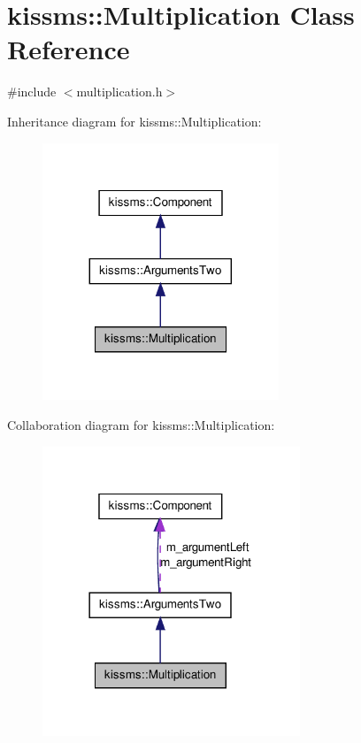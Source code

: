 \hypertarget{classkissms_1_1_multiplication}{\section{kissms\-:\-:Multiplication Class Reference}
\label{classkissms_1_1_multiplication}
}


{\ttfamily \#include $<$multiplication.\-h$>$}



Inheritance diagram for kissms\-:\-:Multiplication\-:
\nopagebreak
\begin{figure}[H]
\begin{center}
\leavevmode
\includegraphics[width=200pt]{classkissms_1_1_multiplication__inherit__graph}
\end{center}
\end{figure}


Collaboration diagram for kissms\-:\-:Multiplication\-:
\nopagebreak
\begin{figure}[H]
\begin{center}
\leavevmode
\includegraphics[width=218pt]{classkissms_1_1_multiplication__coll__graph}
\end{center}
\end{figure}
